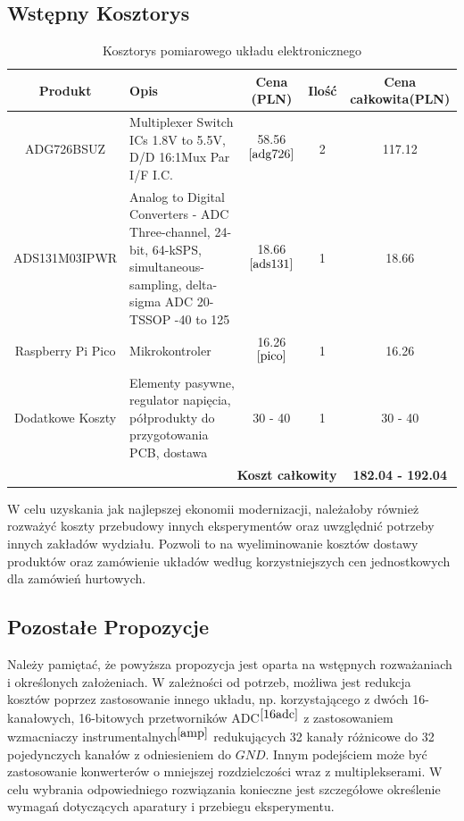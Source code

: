 \documentclass[12pt]{article}
\begin{document}
	\subsection{Wstępny Kosztorys} 
	\begin{table}[h!]
		\centering
		\begin{tabularx}{\textwidth}{|c|X|c|c|c|}
			\hline
			\textbf{Produkt} & \textbf{Opis} & \textbf{Cena (PLN)} & \textbf{Ilość} & \textbf{Cena całkowita(PLN)} \\
			\hline
			ADG726BSUZ & Multiplexer Switch ICs 1.8V to 5.5V, D/D 16:1Mux Par I/F I.C. & 58.56$^{\cite{adg726}}$ & 2 & 117.12 \\
			\hline
			ADS131M03IPWR & Analog to Digital Converters - ADC Three-channel, 24-bit, 64-kSPS, simultaneous-sampling, delta-sigma ADC 20-TSSOP -40 to 125 & 18.66$^{\cite{ads131}}$ & 1 & 18.66 \\
			\hline
			Raspberry Pi Pico & Mikrokontroler & 16.26$^{\cite{pico}}$ & 1 & 16.26 \\
			\hline
			Dodatkowe Koszty & Elementy pasywne, regulator napięcia, półprodukty do przygotowania PCB, dostawa & 30 - 40 & 1 & 30 - 40 \\
			\hline
			\multicolumn{4}{|r|}{\textbf{Koszt całkowity}} & \textbf{182.04 - 192.04} \\
			\hline
		\end{tabularx}
		\caption{Kosztorys pomiarowego układu elektronicznego}
		\label{tab:cost_summary}
	\end{table}
	W celu uzyskania jak najlepszej ekonomii modernizacji, należałoby również rozważyć koszty przebudowy innych eksperymentów oraz uwzględnić potrzeby innych zakładów wydziału. Pozwoli to na wyeliminowanie kosztów dostawy produktów oraz zamówienie układów według korzystniejszych cen jednostkowych dla zamówień hurtowych.
	\subsection{Pozostałe Propozycje}
	Należy pamiętać, że powyższa propozycja jest oparta na wstępnych rozważaniach i określonych założeniach. W zależności od potrzeb, możliwa jest redukcja kosztów poprzez zastosowanie innego układu, np. korzystającego z dwóch 16-kanałowych, 16-bitowych przetworników ADC$^{\cite{16adc}}$ z zastosowaniem wzmacniaczy instrumentalnych$^{\cite{amp}}$ redukujących 32 kanały różnicowe do 32 pojedynczych kanałów z odniesieniem do $GND$. Innym podejściem może być zastosowanie konwerterów o mniejszej rozdzielczości wraz z multiplekserami. W celu wybrania odpowiedniego rozwiązania konieczne jest szczegółowe określenie wymagań dotyczących aparatury i przebiegu eksperymentu.
	
\end{document}
